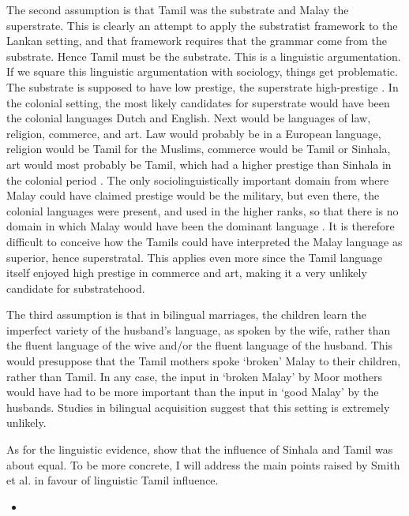 The second assumption is that Tamil was the substrate and Malay the superstrate. This is clearly an attempt to apply the substratist framework to the Lankan setting, and that framework requires that the grammar come from the substrate. Hence Tamil must be the substrate. This is a linguistic argumentation. If we square this linguistic argumentation with sociology, things get problematic. The substrate is supposed to have low prestige, the superstrate high-prestige \citep{abc}. In the colonial setting, the most likely candidates for superstrate would have been the colonial languages Dutch and English. Next would be languages of law, religion, commerce, and art. Law would probably be in a European language, religion would be Tamil for the Muslims, commerce would be Tamil or Sinhala, art would most probably be Tamil, which had a higher prestige than Sinhala in the colonial period \citep{abc}. The only sociolinguistically important domain from where Malay could have claimed prestige would be the military, but even there, the colonial languages were present, and used in the higher ranks, so that there is no domain in which Malay would have been the dominant language \citep{Ansaldo2008genesis}. It is therefore difficult to conceive how the Tamils could have interpreted the Malay language as superior, hence superstratal. This applies even more since the Tamil language itself enjoyed high prestige in commerce and art, making it a very unlikely candidate for substratehood.

The third assumption is that in bilingual marriages, the children learn the imperfect variety of the husband's language, as spoken by the wife, rather than the fluent language of the wive and/or the fluent language of the husband. This would presuppose that the Tamil mothers spoke `broken' Malay to their children, rather than Tamil. In any case, the input in `broken Malay' by Moor mothers would have had to be more important than the input in `good Malay' by the husbands. Studies in bilingual acquisition \citep{abc} suggest that this setting is extremely unlikely. \kuckn

As for the linguistic evidence, \citet{AnsaldoEtAlfclt} show that the influence of Sinhala and Tamil was about equal. To be more concrete, I will address the main points raised by Smith et al. in favour of linguistic Tamil influence.

\begin{itemize}
 \item 
\end{itemize}

